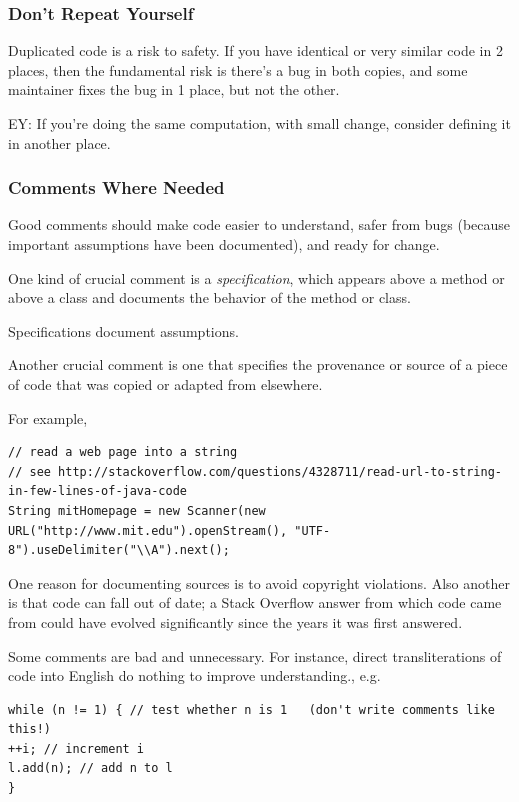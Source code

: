 \documentclass[10pt]{amsart}
\begin{document}
\begin{multicols*}{2}
\subsubsection{Don't Repeat Yourself}

Duplicated code is a risk to safety. If you have identical or very similar code in 2 places, then the fundamental risk is there's a bug in both copies, and some maintainer fixes the bug in 1 place, but not the other.

EY: If you're doing the same computation, with small change, consider defining it in another place.

\subsubsection{Comments Where Needed}

Good comments should make code easier to understand, safer from bugs (because important assumptions have been documented), and ready for change.

One kind of crucial comment is a \emph{specification}, which appears above a method or above a class and documents the behavior of the method or class.

Specifications document assumptions. 

Another crucial comment is one that specifies the provenance or source of a piece of code that was copied or adapted from elsewhere. 

For example,

\begin{verbatim}
// read a web page into a string
// see http://stackoverflow.com/questions/4328711/read-url-to-string-in-few-lines-of-java-code
String mitHomepage = new Scanner(new URL("http://www.mit.edu").openStream(), "UTF-8").useDelimiter("\\A").next();
\end{verbatim}

One reason for documenting sources is to avoid copyright violations. Also another is that code can fall out of date; a Stack Overflow answer from which code came from could have evolved significantly since the years it was first answered.

Some comments are bad and unnecessary. For instance, direct transliterations of code into English do nothing to improve understanding., e.g.

\begin{verbatim}
while (n != 1) { // test whether n is 1   (don't write comments like this!)
++i; // increment i
l.add(n); // add n to l
}
\end{verbatim}


\end{multicols*}
\end{document}
